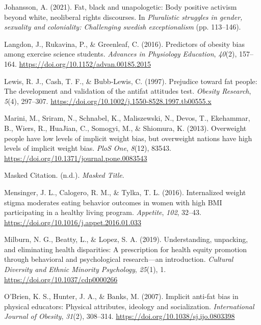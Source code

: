 \documentclass[
  jou,
  longtable,
  nolmodern,
  notxfonts,
  notimes,
  colorlinks=true,linkcolor=blue,citecolor=blue,urlcolor=blue]{apa7}
\newlength{\cslhangindent}
\newenvironment{CSLReferences}[2] %
 {\begin{list}{}{%
  \setlength{\itemindent}{0pt}
  \setlength{\leftmargin}{0pt}
  \setlength{\parsep}{0pt}
  \ifodd #1
   \setlength{\leftmargin}{\cslhangindent}
   \setlength{\itemindent}{-1\cslhangindent}
  \fi
  \setlength{\itemsep}{#2\baselineskip}}}
 {\end{list}}
\begin{document}
\begin{CSLReferences}{1}{0}
Johansson, A. (2021). Fat, black and unapologetic: Body positive
activism beyond white, neoliberal rights discourses. In
\emph{Pluralistic struggles in gender, sexuality and coloniality:
Challenging swedish exceptionalism} (pp. 113--146).

Langdon, J., Rukavina, P., \& Greenleaf, C. (2016). Predictors of
obesity bias among exercise science students. \emph{Advances in
Physiology Education}, \emph{40}(2), 157--164.
\url{https://doi.org/10.1152/advan.00185.2015}

Lewis, R. J., Cash, T. F., \& Bubb‐Lewis, C. (1997). Prejudice toward
fat people: The development and validation of the antifat attitudes
test. \emph{Obesity Research}, \emph{5}(4), 297--307.
\url{https://doi.org/10.1002/j.1550-8528.1997.tb00555.x}

Marini, M., Sriram, N., Schnabel, K., Maliszewski, N., Devos, T.,
Ekehammar, B., Wiers, R., HuaJian, C., Somogyi, M., \& Shiomura, K.
(2013). Overweight people have low levels of implicit weight bias, but
overweight nations have high levels of implicit weight bias. \emph{PloS
One}, \emph{8}(12), 83543.
\url{https://doi.org/10.1371/journal.pone.0083543}

Masked Citation. (n.d.). \emph{Masked Title}.

Mensinger, J. L., Calogero, R. M., \& Tylka, T. L. (2016). Internalized
weight stigma moderates eating behavior outcomes in women with high BMI
participating in a healthy living program. \emph{Appetite}, \emph{102},
32--43. \url{https://doi.org/10.1016/j.appet.2016.01.033}

Milburn, N. G., Beatty, L., \& Lopez, S. A. (2019). Understanding,
unpacking, and eliminating health disparities: A prescription for health
equity promotion through behavioral and psychological research---an
introduction. \emph{Cultural Diversity and Ethnic Minority Psychology},
\emph{25}(1), 1. \url{https://doi.org/10.1037/cdp0000266}

O'Brien, K. S., Hunter, J. A., \& Banks, M. (2007). Implicit anti-fat
bias in physical educators: Physical attributes, ideology and
socialization. \emph{International Journal of Obesity}, \emph{31}(2),
308--314. \url{https://doi.org/10.1038/sj.ijo.0803398}


\end{CSLReferences}
\end{document}
